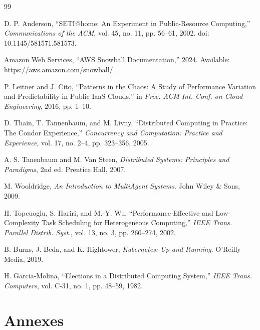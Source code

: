 \documentclass[12pt,a4paper]{report}
\begin{document}
\begin{thebibliography}{99}

D. P. Anderson,
``SETI@home: An Experiment in Public-Resource Computing,''
\textit{Communications of the ACM}, vol. 45, no. 11, pp. 56--61, 2002.
doi: 10.1145/581571.581573.

Amazon Web Services,
``AWS Snowball Documentation,''
2024. Available: \url{https://aws.amazon.com/snowball/}

P. Leitner and J. Cito,
``Patterns in the Chaos: A Study of Performance Variation and Predictability in Public IaaS Clouds,''
in \textit{Proc. ACM Int. Conf. on Cloud Engineering}, 2016, pp. 1--10.

D. Thain, T. Tannenbaum, and M. Livny,
``Distributed Computing in Practice: The Condor Experience,''
\textit{Concurrency and Computation: Practice and Experience}, vol. 17, no. 2--4, pp. 323--356, 2005.

A. S. Tanenbaum and M. Van Steen,
\textit{Distributed Systems: Principles and Paradigms}, 2nd ed.
Prentice Hall, 2007.

M. Wooldridge,
\textit{An Introduction to MultiAgent Systems}.
John Wiley \& Sons, 2009.

H. Topcuoglu, S. Hariri, and M.-Y. Wu,
``Performance-Effective and Low-Complexity Task Scheduling for Heterogeneous Computing,''
\textit{IEEE Trans. Parallel Distrib. Syst.}, vol. 13, no. 3, pp. 260--274, 2002.

B. Burns, J. Beda, and K. Hightower,
\textit{Kubernetes: Up and Running}.
O'Reilly Media, 2019.

H. Garcia-Molina,
``Elections in a Distributed Computing System,''
\textit{IEEE Trans. Computers}, vol. C-31, no. 1, pp. 48--59, 1982.

\end{thebibliography}
\section*{Annexes}
\end{document}
